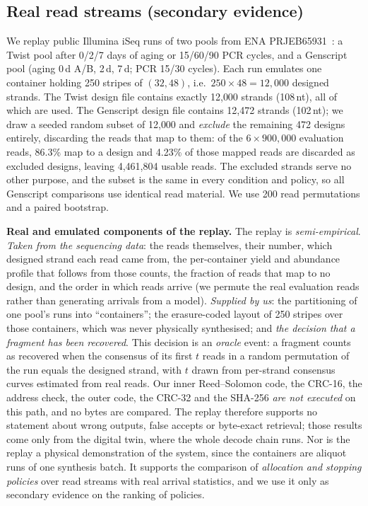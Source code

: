 \documentclass[conference,onecolumn,11pt]{IEEEtran}
\begin{document}
\subsection{Real read streams (secondary evidence)}
We replay public Illumina iSeq runs of two pools from ENA PRJEB65931~\cite{gimpel2023digital,gimpel2023prjeb65931}:
a Twist pool after 0/2/7 days of aging or 15/60/90 PCR cycles, and a Genscript pool (aging 0\,d A/B,
2\,d, 7\,d; PCR 15/30 cycles).  Each run emulates one container holding 250 stripes of $(32,48)$,
i.e.\ $250\times48=12{,}000$ designed strands.  The Twist design file contains exactly 12{,}000
strands (108\,nt), all of which are used.  The Genscript design file contains 12{,}472 strands
(102\,nt); we draw a seeded random subset of 12{,}000 and \emph{exclude} the remaining 472 designs
entirely, discarding the reads that map to them: of the $6\times900{,}000$ evaluation reads, 86.3\%
map to a design and 4.23\% of those mapped reads are discarded as excluded designs, leaving
4{,}461{,}804 usable reads.  The excluded strands serve no other purpose, and the subset is the same
in every condition and policy, so all Genscript comparisons use identical read material.  We use 200
read permutations and a paired bootstrap.

\textbf{Real and emulated components of the replay.}  The replay is \emph{semi-empirical}.
\emph{Taken from the sequencing data}: the reads themselves, their number, which designed strand each
read came from, the per-container yield and abundance profile that follows from those counts, the
fraction of reads that map to no design, and the order in which reads arrive (we permute the real
evaluation reads rather than generating arrivals from a model).  \emph{Supplied by us}: the
partitioning of one pool's runs into ``containers''; the erasure-coded layout of 250 stripes over those
containers, which was never physically synthesised; and \emph{the decision that a fragment has been
recovered}.  This decision is an \emph{oracle} event: a fragment counts as recovered when the consensus
of its first $t$ reads in a random permutation of the run equals the designed strand, with $t$ drawn
from per-strand consensus curves estimated from real reads.  Our inner Reed--Solomon code, the CRC-16,
the address check, the outer code, the CRC-32 and the SHA-256 \emph{are not executed} on this path, and
no bytes are compared.  The replay therefore supports no statement about wrong outputs, false accepts or
byte-exact retrieval; those results come only from the digital twin, where the whole decode chain runs.
Nor is the replay a physical demonstration of the system, since the containers are aliquot runs of one
synthesis batch.  It supports the comparison of \emph{allocation and stopping policies} over read
streams with real arrival statistics, and we use it only as secondary evidence on the ranking of
policies.
\end{document}
